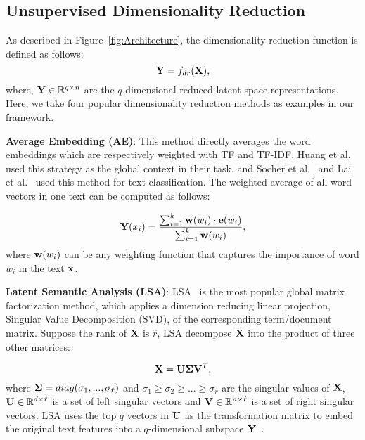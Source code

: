 \documentclass[review]{elsarticle}
\begin{document}
\subsection{Unsupervised Dimensionality Reduction}
\label{sec:Unsupervised}
As described in Figure~\ref{fig:Architecture}, the dimensionality reduction function is defined as follows:
\begin{equation}
{\bf{Y}} = {f_{dr}}({\bf{X}}),
\end{equation}
where, \({\bf{Y}} \in {\mathbb{R}^{q \times n}}\) are the \(q\)-dimensional reduced latent space representations. Here, we take four popular dimensionality reduction methods as examples in our framework.

{\bf{Average Embedding (AE)}}: This method directly averages the word embeddings which are respectively weighted with TF and TF-IDF. Huang et al.~\cite{13_huang2012improving} used this strategy as the global context in their task, and Socher et al.~\cite{35_socher2013recursive} and Lai et al.~\cite{14_lai2015rcnn} used this method for text classification. The weighted average of all word vectors in one text can be computed as follows:

\begin{equation}
{\bf{Y}}({x_i}) = \frac{{\sum\nolimits_{i = 1}^k {{\bf{w}}({w_i}) \cdot {\bf{e}}({w_i})} }}{{\sum\nolimits_{i = 1}^k {{\bf{w}}({w_i})} }},
\end{equation}
where \({{\bf{w}}({w_i})}\) can be any weighting function that captures the importance of word \({{w_i}}\) in the text \({{\bf {x}}}\).

{\bf{Latent Semantic Analysis (LSA)}}: LSA~\cite{deerwester1990indexing} is the most popular global matrix factorization method, which applies a dimension reducing linear projection, Singular Value Decomposition (SVD), of the corresponding term/document matrix. Suppose the rank of \({\bf{X}}\) is \({ \hat{r}} \), LSA decompose \({\bf{X}}\) into the product of three other matrices:

\begin{equation}
{\bf{X}} = {\bf{U\Sigma }}{{\bf{V}}^T},
\end{equation}
where \({\bf{\Sigma }} = diag({\sigma _1},...,{\sigma _{\hat{r}}})\) and \({\sigma _1} \ge {\sigma _2} \ge ... \ge {\sigma _{\hat{r}}}\) are the singular values of \({\bf{X}}\), \({\bf{U}} \in {\mathbb{R}^{d \times {\hat{r}}}}\) is a set of left singular vectors and \({\bf{V}} \in {\mathbb{R}^{n \times {\hat{r}}}}\) is a set of right singular vectors. LSA uses the top \( q \) vectors in \( {\bf {U}}\) as the transformation matrix to embed the original text features into a \( q \)-dimensional subspace \( {\bf {Y}}\)~\cite{deerwester1990indexing}.
\end{document}
